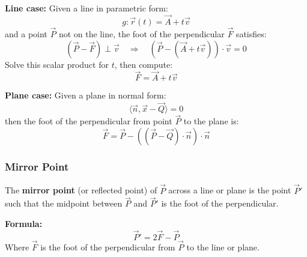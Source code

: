 \textbf{Line case:}
Given a line in parametric form:
\[
	g: \vec{r}(t) = \vec{A} + t\vec{v}
\]
and a point $\vec{P}$ not on the line, the foot of the perpendicular $\vec{F}$ satisfies:
\[
	(\vec{P} - \vec{F}) \perp \vec{v} \quad \Rightarrow \quad (\vec{P} - (\vec{A} + t\vec{v})) \cdot \vec{v} = 0
\]
Solve this scalar product for $t$, then compute:
\[
	\vec{F} = \vec{A} + t\vec{v}
\]

\textbf{Plane case:}
Given a plane in normal form:
\[
	\langle \vec{n}, \vec{x} - \vec{Q} \rangle = 0
\]
then the foot of the perpendicular from point $\vec{P}$ to the plane is:
\[
	\vec{F} = \vec{P} - ((\vec{P} - \vec{Q}) \cdot \vec{n}) \cdot \vec{n}
\]

\subsubsection{Mirror Point}

The \textbf{mirror point} (or reflected point) of $\vec{P}$ across a line or plane is the point $\vec{P}'$ such that the midpoint between $\vec{P}$ and $\vec{P}'$ is the foot of the perpendicular.

\noindent \textbf{Formula:}
\[
	\vec{P}' = 2\vec{F} - \vec{P}
\]
Where $\vec{F}$ is the foot of the perpendicular from $\vec{P}$ to the line or plane.

\newpage